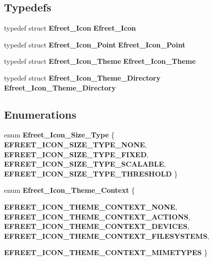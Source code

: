 \subsection*{Typedefs}
\begin{CompactItemize}
\item 
typedef struct {\bf Efreet\_\-Icon} {\bf Efreet\_\-Icon}
\item 
typedef struct {\bf Efreet\_\-Icon\_\-Point} {\bf Efreet\_\-Icon\_\-Point}
\item 
typedef struct {\bf Efreet\_\-Icon\_\-Theme} {\bf Efreet\_\-Icon\_\-Theme}
\item 
typedef struct {\bf Efreet\_\-Icon\_\-Theme\_\-Directory} {\bf Efreet\_\-Icon\_\-Theme\_\-Directory}
\end{CompactItemize}
\subsection*{Enumerations}
\begin{CompactItemize}
\item 
enum {\bf Efreet\_\-Icon\_\-Size\_\-Type} \{ {\bf EFREET\_\-ICON\_\-SIZE\_\-TYPE\_\-NONE}, 
{\bf EFREET\_\-ICON\_\-SIZE\_\-TYPE\_\-FIXED}, 
{\bf EFREET\_\-ICON\_\-SIZE\_\-TYPE\_\-SCALABLE}, 
{\bf EFREET\_\-ICON\_\-SIZE\_\-TYPE\_\-THRESHOLD}
 \}
\item 
enum {\bf Efreet\_\-Icon\_\-Theme\_\-Context} \{ \par
{\bf EFREET\_\-ICON\_\-THEME\_\-CONTEXT\_\-NONE}, 
{\bf EFREET\_\-ICON\_\-THEME\_\-CONTEXT\_\-ACTIONS}, 
{\bf EFREET\_\-ICON\_\-THEME\_\-CONTEXT\_\-DEVICES}, 
{\bf EFREET\_\-ICON\_\-THEME\_\-CONTEXT\_\-FILESYSTEMS}, 
\par
{\bf EFREET\_\-ICON\_\-THEME\_\-CONTEXT\_\-MIMETYPES}
 \}
\end{CompactItemize}
